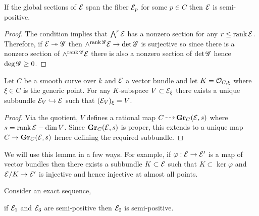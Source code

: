 \documentclass[12pt]{article}
\begin{document}
\begin{lemma} \label{lemma:sections_imply_semipositive}
If the global sections of $\mathcal{E}$ span the fiber $\mathcal{E}_p$ for some $p \in C$ then $\mathcal{E}$ is semi-positive.
\end{lemma}

\begin{proof}
The condition implies that $\bigwedge^r \mathcal{E}$ has a nonzero section for any $r \le \operatorname{\mathrm{rank}}{\mathcal{E}}$. Therefore, if $\mathcal{E} \twoheadrightarrow \mathscr{G}$ then $\wedge^{\operatorname{\mathrm{rank}}{\mathscr{G}}} \mathcal{E} \to \det{\mathscr{G}}$ is surjective so since there is a nonzero section of $\wedge^{\operatorname{\mathrm{rank}}{\mathscr{G}}}{\mathcal{E}}$ there is also a nonzero section of $\det{\mathscr{G}}$ hence $\deg{\mathscr{G}} \ge 0$.
\end{proof}

\begin{lemma}
Let $C$ be a smooth curve over $k$ and $\mathcal{E}$ a vector bundle and let $K = \mathcal{O}_{C, \xi}$ where $\xi \in C$ is the generic point. For any $K$-subspace $V \subset \mathcal{E}_\xi$ there exists a unique subbundle $\mathcal{E}_V \hookrightarrow \mathcal{E}$ such that $(\mathcal{E}_V)_\xi = V$.
\end{lemma}

\begin{proof}
Via the quotient, $V$ defines a rational map $C \rat \Gr_{C}(\E, s)$ where $s = \operatorname{\mathrm{rank}}{\mathcal{E}} - \dim{V}$. Since $\mathbf{Gr}_{C}(\mathcal{E}, s)$ is proper, this extends to a unique map $C \to \mathbf{Gr}_{C}(\mathcal{E}, s)$ hence defining the required subbundle.
\end{proof}

\begin{rmk}
We will use this lemma in a few ways. For example, if $\varphi : \mathcal{E} \to \mathcal{E}'$ is a map of vector bundles then there exists a subbundle $K \subset \mathcal{E}$ such that $K \subset \ker{\varphi}$ and $\mathcal{E} / K \to \mathcal{E}'$ is injective and hence injective at almost all points. 
\end{rmk}

\begin{lemma}
Consider an exact sequence,
\begin{center}
\end{center}
if $\mathcal{E}_1$ and $\mathcal{E}_3$ are semi-positive then $\mathcal{E}_2$ is semi-positive.
\end{lemma}
\end{document}
